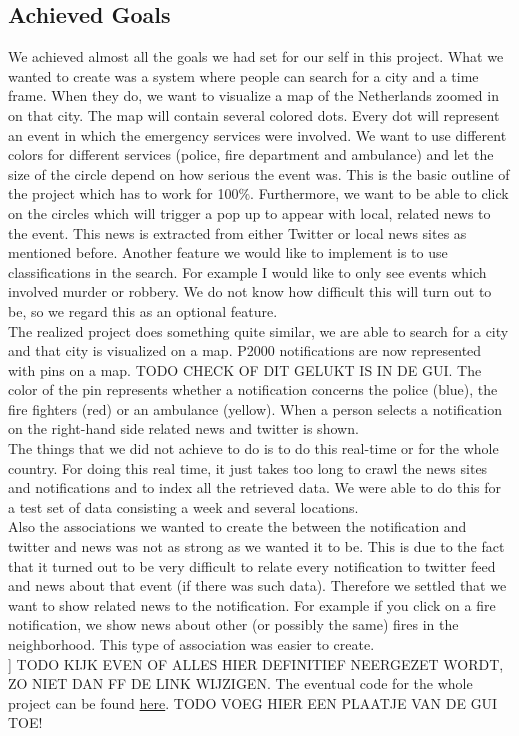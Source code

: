 \subsection*{Achieved Goals}
We achieved almost all the goals we had set for our self in this project. 
What we wanted to create was a system where people can search for a city and a time frame.
When they do, we want to visualize a map of the Netherlands zoomed in on that city. 
The map will contain several colored dots. 
Every dot will represent an event in which the emergency services were involved. 
We want to use different colors for different services (police, fire department and ambulance) and let the size of the circle depend on how serious the event was. This is the basic outline of the project which has to work for 100$\%$. Furthermore, we want to be able to click on the circles which will trigger a pop up to appear with local, related news to the event. This news is extracted from either Twitter or local news sites as mentioned before. Another feature we would like to implement is to use classifications in the search. For example I would like to only see events which involved murder or robbery. We do not know how difficult this will turn out to be, so we regard this as an optional feature.\\
The realized project does something quite similar, we are able to search for a city and that city is visualized on a map.
P2000 notifications are now represented with pins on a map. 
TODO CHECK OF DIT GELUKT IS IN DE GUI. The color of the pin represents whether a notification concerns the police (blue), the fire fighters (red) or an ambulance (yellow).
When a person selects a notification on the right-hand side related news and twitter is shown.\\
The things that we did not achieve to do is to do this real-time or for the whole country. 
For doing this real time, it just takes too long to crawl the news sites and notifications and to index all the retrieved data.
We were able to do this for a test set of data consisting a week and several locations.\\
Also the associations we wanted to create the between the notification and twitter and news was not as strong as we wanted it to be.
This is due to the fact that it turned out to be very difficult to relate every notification to twitter feed and news about that event (if there was such data).
Therefore we settled that we want to show related news to the notification.
For example if you click on a fire notification, we show news about other (or possibly the same) fires in the neighborhood.
This type of association was easier to create.\\]
TODO KIJK EVEN OF ALLES HIER DEFINITIEF NEERGEZET WORDT, ZO NIET DAN FF DE LINK WIJZIGEN.
The eventual code for the whole project can be found \href{https://www.dropbox.com/home/Public/Code_2IMW15_Group_20}{here}.
TODO VOEG HIER EEN PLAATJE VAN DE GUI TOE!
